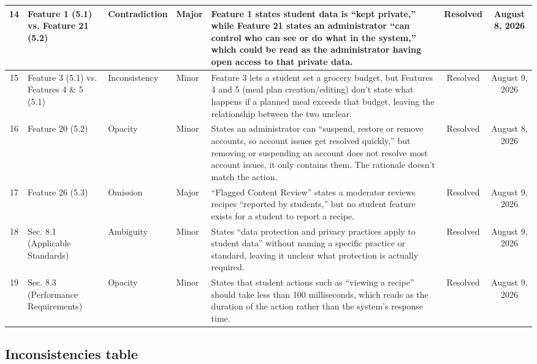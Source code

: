 \documentclass[10pt,letterpaper]{article}
\begin{document}
\begin{longtable}{|c|p{2.3cm}|p{2cm}|p{1.5cm}|p{4.5cm}|c|c|}
14 & Feature 1 (5.1) vs. Feature 21 (5.2) & Contradiction & Major & Feature 1 states student data is ``kept private,'' while Feature 21 states an administrator ``can control who can see or do what in the system,'' which could be read as the administrator having open access to that private data. & Resolved & August 8, 2026 \\
\hline


15 & Feature 3 (5.1) vs. Features 4 \& 5 (5.1) & Inconsistency & Minor & Feature 3 lets a student set a grocery budget, but Features 4 and 5 (meal plan creation/editing) don't state what happens if a planned meal exceeds that budget, leaving the relationship between the two unclear. & Resolved & August 9, 2026 \\
\hline

16 & Feature 20 (5.2) & Opacity & Minor & States an administrator can ``suspend, restore or remove accounts, so account issues get resolved quickly,'' but removing or suspending an account does not resolve most account issues, it only contains them. The rationale doesn't match the action. & Resolved & August 8, 2026 \\
\hline

17 & Feature 26 (5.3) & Omission & Major & ``Flagged Content Review'' states a moderator reviews recipes ``reported by students,'' but no student feature exists for a student to report a recipe. & Resolved & August 9, 2026 \\
\hline

18 & Sec. 8.1 (Applicable Standards) & Ambiguity & Minor & States ``data protection and privacy practices apply to student data'' without naming a specific practice or standard, leaving it unclear what protection is actually required. & Resolved & August 9, 2026 \\
\hline

19 & Sec. 8.3 (Performance Requirements) & Opacity & Minor & States that student actions such as ``viewing a recipe'' should take less than 100 milliseconds, which reads as the duration of the action rather than the system's response time. & Resolved & August 9, 2026 \\
\hline

\end{longtable}


\subsection{Inconsistencies table}
\end{document}
